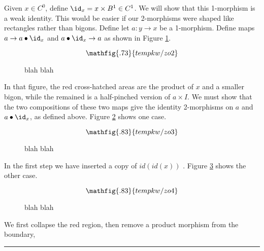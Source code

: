 Given $x\in C^0$, define $\id_x = x\times B^1 \in C^1$.
We will show that this 1-morphism is a weak identity.
This would be easier if our 2-morphisms were shaped like rectangles rather than bigons.
Define let $a: y\to x$ be a 1-morphism.
Define maps $a \to a\bullet \id_x$ and $a\bullet \id_x \to a$
as shown in Figure \ref{fzo2}.
\begin{figure}[t]
\begin{equation*}
\mathfig{.73}{tempkw/zo2}
\end{equation*}
\caption{blah blah}
\label{fzo2}
\end{figure}
In that figure, the red cross-hatched areas are the product of $x$ and a smaller bigon,
while the remained is a half-pinched version of $a\times I$.
We must show that the two compositions of these two maps give the identity 2-morphisms
on $a$ and $a\bullet \id_x$, as defined above.
Figure \ref{fzo3} shows one case.
\begin{figure}[t]
\begin{equation*}
\mathfig{.83}{tempkw/zo3}
\end{equation*}
\caption{blah blah}
\label{fzo3}
\end{figure}
In the first step we have inserted a copy of $id(id(x))$ .
Figure \ref{fzo4} shows the other case.
\begin{figure}[t]
\begin{equation*}
\mathfig{.83}{tempkw/zo4}
\end{equation*}
\caption{blah blah}
\label{fzo4}
\end{figure}
We first collapse the red region, then remove a product morphism from the boundary,




\medskip
\hrule
\medskip

\medskip
